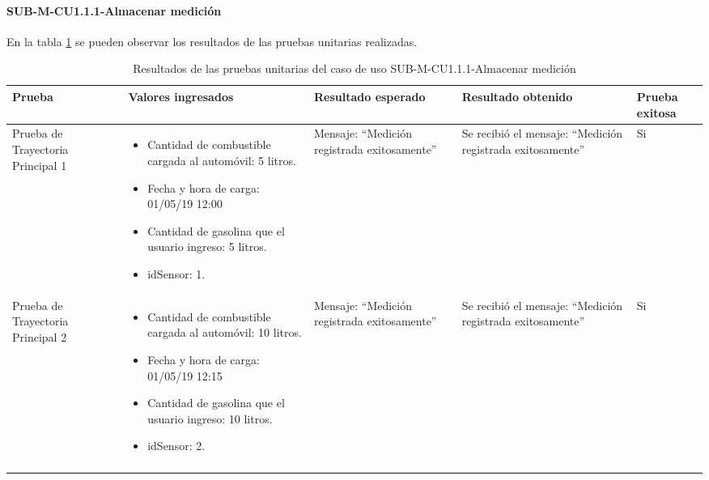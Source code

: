 \paragraph{SUB-M-CU1.1.1-Almacenar medición}\label{SUB-M-CU1.1.1:Pruebas}
En la tabla \ref{pruebas_unitarias_sub-m-cu1.1.1} se pueden observar los resultados de las pruebas unitarias realizadas.
\begin{longtable}{|M{2cm}| M{4.5cm}|M{3cm}|M{3cm}|M{1.5cm}|}
	\hline
	\textbf{Prueba} & \textbf{Valores ingresados} & \textbf{Resultado esperado} & \textbf{Resultado obtenido} & \textbf{Prueba exitosa} \\ \hline
	Prueba de Trayectoria Principal 1& 
	\begin{itemize}
		\item Cantidad de combustible cargada al automóvil: 5 litros.
		\item Fecha y hora de carga: 01/05/19 12:00
		\item Cantidad de gasolina que el usuario ingreso: 5 litros.
		\item idSensor: 1.
	\end{itemize}
	& Mensaje: ``Medición registrada exitosamente'' & Se recibió el mensaje: ``Medición registrada exitosamente'' & Si \\ \hline
	Prueba de Trayectoria Principal 2& 
	\begin{itemize}
		\item Cantidad de combustible cargada al automóvil: 10 litros.
		\item Fecha y hora de carga: 01/05/19 12:15
		\item Cantidad de gasolina que el usuario ingreso: 10 litros.
		\item idSensor: 2.
	\end{itemize}
	& Mensaje: ``Medición registrada exitosamente'' & Se recibió el mensaje: ``Medición registrada exitosamente'' & Si \\ \hline
	\caption{Resultados de las pruebas unitarias del caso de uso SUB-M-CU1.1.1-Almacenar medición}
	\label{pruebas_unitarias_sub-m-cu1.1.1}
\end{longtable}
